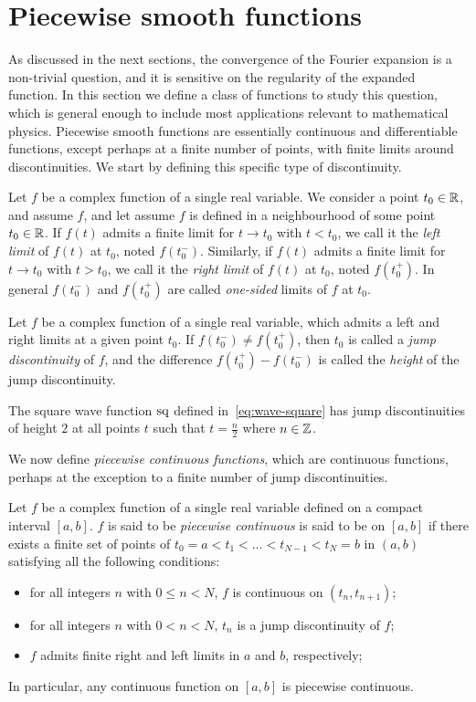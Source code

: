 \section{Piecewise smooth functions}
As discussed in the next sections, the convergence of the Fourier expansion is a
non-trivial question, and it is sensitive on the regularity of the expanded function. In
this section we define a class of functions to study this question, which is general
enough to include most applications relevant to mathematical physics. Piecewise smooth
functions are essentially continuous and differentiable functions, except perhaps at a
finite number of points, with finite limits around discontinuities. We start by defining
this specific type of discontinuity.
\begin{definition}
	\label{def:limit-onesided}
	Let $f$ be a complex function of a single real variable. We consider a point $t_0\in\mathbb{R}$,
	and assume $f$, and let assume $f$ is defined in a neighbourhood of some point
	$t_0\in\mathbb{R}$. If $f(t)$ admits a finite limit for $t\to t_0$ with $t<t_0$, we call it the
	\emph{left limit} of $f(t)$ at $t_0$, noted $f(t_0^-)$. Similarly, if $f(t)$ admits a
	finite limit for $t\to t_0$ with $t>t_0$, we call it the \emph{right limit} of $f(t)$ at
	$t_0$, noted $f(t_0^+)$. In general $f(t_0^-)$ and $f(t_0^+)$ are called
	\emph{one-sided} limits of $f$ at $t_0$.
\end{definition}
\begin{definition}
	Let $f$ be a complex function of a single real variable, which admits a left and right
	limits at a given point $t_0$. If $f(t_0^-)\neq f(t_0^+)$, then $t_0$ is called a
	\emph{jump discontinuity} of $f$, and the difference $f(t_0^+)-f(t_0^-)$ is called the
	\emph{height} of the jump discontinuity.
\end{definition}
\begin{example}
	The square wave function $\operatorname{sq}$ defined in~\cref{eq:wave-square} has jump discontinuities
	of height $2$ at all points $t$ such that $t=\frac{n}{2}$ where $n\in\mathbb{Z}$.
\end{example}
We now define \emph{piecewise continuous functions}, which are continuous functions,
perhaps at the exception to a finite number of jump discontinuities.
\begin{definition}
	\label{def:pw-cont}
	Let $f$ be a complex function of a single real variable defined on a compact interval
	$[a,b]$. $f$ is said to be \emph{piecewise continuous} is said to be on $[a,b]$ if there
	exists a finite set of points of $t_0=a<t_1<\dots<t_{N-1}<t_N=b$ in $(a,b)$ satisfying
	all the following conditions:
	\begin{itemize}
		\item[(PC1)] for all integers $n$ with $0\leq n< N$, $f$ is continuous on
		      $(t_n,t_{n+1})$;
		\item[(PC2)] for all integers $n$ with $0< n< N$, $t_n$ is a jump discontinuity of
		      $f$;
		\item[(PC3)] $f$ admits finite right and left limits in $a$ and $b$, respectively;
	\end{itemize}
	In particular, any continuous function on $[a,b]$ is piecewise continuous.
\end{definition}
